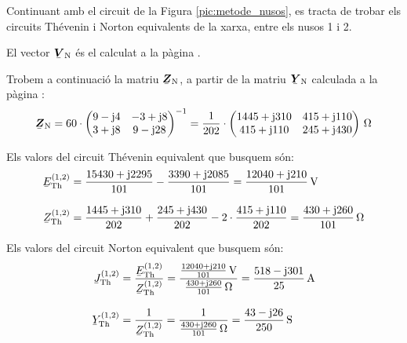 \begin{exemple}
Continuant amb el circuit de la Figura \vref{pic:metode_nusos}, es
tracta de trobar els circuits Th\'{e}venin i Norton equivalents de la
xarxa, entre els nusos 1 i 2.

El vector $\mcmplx{V}\ped{N}$ \'{e}s el calculat a la p\`{a}gina \pageref{eq:vn_exemp}.

Trobem a continuaci\'{o} la matriu $\mcmplx{Z}\ped{N}$, a partir de la matriu $\mcmplx{Y}\ped{N}$
calculada a la p\`{a}gina \pageref{eq:yn}:
\[
   \mcmplx{Z}\ped{N} =
   60 \cdot \begin{pmatrix}
            9 - \ju 4 & -3 + \ju 8 \\
            3 + \ju 8 & 9 - \ju 28
      \end{pmatrix} ^{-1} =
   \frac{1}{202} \cdot \begin{pmatrix}
         1445 + \ju 310 & 415 + \ju 110 \\
         415 + \ju 110 & 245 + \ju 430
   \end{pmatrix}\unit{\ohm}
\]

Els valors del circuit Th\'{e}venin equivalent que busquem s\'{o}n:
\begin{align*}
   \cmplx{E}\ped{Th}^{(1,2)} &= \frac{15430 + \ju 2295}{101} - \frac{3390 + \ju 2085}{101} =
   \frac{12040 + \ju 210}{101}\unit{V} \\[2ex]
   \cmplx{Z}\ped{Th}^{(1,2)} &= \frac{1445 + \ju 310}{202} + \frac{245 + \ju 430}{202} -
   2\cdot\frac{415 + \ju 110}{202} = \frac{430 + \ju 260}{101}\unit{\ohm}
\end{align*}

Els valors del circuit Norton equivalent que busquem s\'{o}n:
\begin{align*}
   \cmplx{J}\ped{Th}^{(1,2)} &= \frac{\cmplx{E}\ped{Th}^{(1,2)}}{\cmplx{Z}\ped{Th}^{(1,2)}} =
   \frac{\frac{12040 + \ju 210}{101}\unit{V}}{\frac{430 + \ju 260}{101}\unit{\ohm}} =
   \frac{518 - \ju 301}{25}\unit{A} \\[2ex]
   \cmplx{Y}\ped{Th}^{(1,2)} &= \frac{1}{\cmplx{Z}\ped{Th}^{(1,2)}} =
   \frac{1}{\frac{430 + \ju 260}{101}\unit{\ohm}} = \frac{43 - \ju 26}{250}\unit{S}
\end{align*}

\end{exemple}
